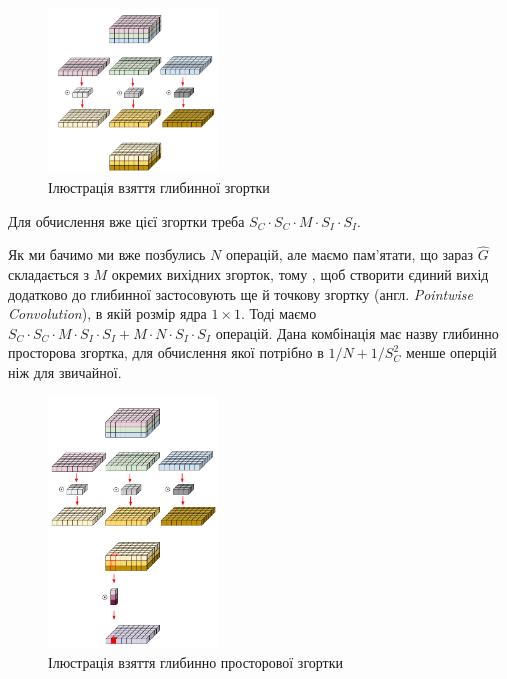\begin{figure}[H]
    \centering
    \includegraphics[width=0.4\textwidth]{images/cnn_deep_wise_conv}
    \caption{Ілюстрація взяття глибинної згортки  \cite{deep_wise_sep_conv_website}
    \label{fig:cnn:deep_wise_conv}
    }
\end{figure}

Для обчислення вже цієї згортки треба  $S_C · S_C · M · S_I · S_I$.

Як ми бачимо ми вже позбулись $N$ операцій, але маємо пам'ятати, що
зараз $\widehat{G}$ складається з $M$ окремих вихідних згорток, тому
, щоб створити єдиний вихід додатково до глибинної застосовують ще 
й точкову згортку (англ. \textit{Pointwise Convolution}), в якій розмір
ядра $1 \times 1$. Тоді маємо 
$S_C · S_C · M · S_I · S_I + M · N · S_I · S_I$ операцій. 
Дана комбінація має назву глибинно просторова згортка, для 
обчислення якої потрібно в $1/N + 1/S_C^2$ менше оперцій ніж
для звичайної.

\begin{figure}[H]
    \centering
    \includegraphics[width=0.4\textwidth]{images/cnn_deep_wise_separable_conv}
    \caption{Ілюстрація взяття глибинно просторової згортки  \cite{deep_wise_sep_conv_website}
    \label{fig:cnn:deep_wise_sep_conv}
    }
\end{figure}


